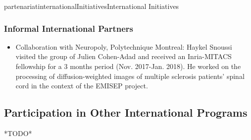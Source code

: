 \documentclass{ra2018}
\begin{document}
\begin{module}{partenariat}{internationalInitiatives}{International Initiatives}
        \subsubsection{Informal International Partners}
        

\begin{itemize}
    \item Collaboration with Neuropoly, Polytechnique Montreal: Haykel Snoussi visited the group of Julien Cohen-Adad and received an Inria-MITACS fellowship for a 3 months period (Nov. 2017-Jan. 2018). He worked on the processing of diffusion-weighted images of multiple sclerosis patients' spinal cord in the context of the EMISEP project.
\end{itemize}

\subsection{Participation in Other International Programs}
*TODO*





\end{module}
\end{document}
